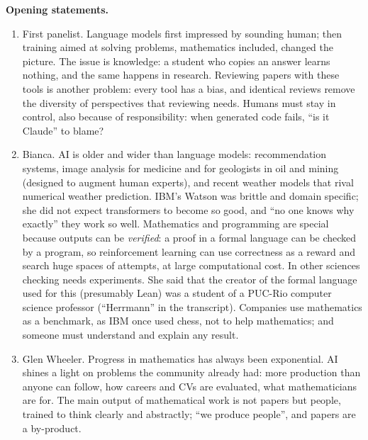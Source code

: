 \medskip\noindent
{\bf Opening statements.}
\begin{enumerate}
\item First panelist. Language models first
impressed by sounding human; then training
aimed at solving problems, mathematics
included, changed the picture. The issue is
knowledge: a student who copies an answer
learns nothing, and the same happens in
research. Reviewing papers with these tools
is another problem: every tool has a bias,
and identical reviews remove the diversity
of perspectives that reviewing needs.
Humans must stay in control, also because of
responsibility: when generated code fails,
``is it Claude'' to blame?
\item Bianca. AI is older and wider than
language models: recommendation systems,
image analysis for medicine and for
geologists in oil and mining (designed to
augment human experts), and recent weather
models that rival numerical weather
prediction. IBM's Watson was brittle and
domain specific; she did not expect
transformers to become so good, and ``no
one knows why exactly'' they work so well.
Mathematics and programming are special
because outputs can be \emph{verified}: a
proof in a formal language can be checked
by a program, so reinforcement learning can
use correctness as a reward and search huge
spaces of attempts, at large computational
cost. In other sciences checking needs
experiments. She said that the creator of
the formal language used for this
(presumably Lean) was a student of a
PUC-Rio computer science professor
(``Herrmann'' in the transcript).
Companies use mathematics as a benchmark,
as IBM once used chess, not to help
mathematics; and someone must understand
and explain any result.
\item Glen Wheeler. Progress in mathematics
has always been exponential. AI shines a
light on problems the community already
had: more production than anyone can follow,
how careers and CVs are evaluated, what
mathematicians are for. The main output of
mathematical work is not papers but people,
trained to think clearly and abstractly;
``we produce people'', and papers are a
by-product.
\end{enumerate}

